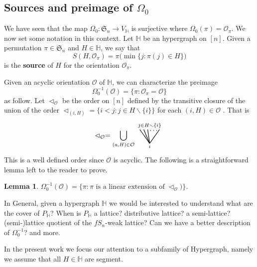 \documentclass[reqno]{amsart}
\newtheorem{lemma}[theorem]{Lemma}
\theoremstyle{definition}
\newcommand{\ssm}{\smallsetminus} %
\newcommand{\defn}[1]{\textbf{\textsf{\color{PineGreen} #1}}} %
\newcommand{\fS}{\mathfrak{S}} %
\newcommand{\less}{\vartriangleleft} %
\newcommand{\Or}{\mathcal O}  %
\newcommand{\HH}{\mathbb H}  %
\begin{document}
\subsection{Sources and preimage of $\Omega_0$} 
\label{subsec:notation}

We have seen that the map $\Omega_0 \colon \fS_n \to V_{\HH}$ is surjective where $\Omega_0(\pi)=\Or_\pi$.
We now set some notation in this context. Let $\HH$ be  an hypergraph on $[n]$. Given a permutation $\pi\in\fS_n$ and $H\in \HH$,
we say that 
\begin{equation}\label{eq:source}
	S(H,\Or_\pi)=\pi\big( \min\{j:\pi(j)\in H\}\big)
\end{equation}
is the \defn{source} of $H$ for the orientation $\Or_\pi$. 

Given an acyclic orientation $\Or$ of $\HH$,  we can characterize the preimage 
	$$ \Omega_0^{-1}(\Or)=\{ \pi : \Or_\pi=\Or\}$$
as follow. Let $\less_\Or$ be the order on $[n]$ defined by the transitive closure of the union of 
the order $\less_{(i,H)}=\big\{ i< j : j\in H\ssm\{i\}\big\}$ for each $(i,H)\in \Or$ . That is
 	$$\less_\Or =  \bigcup_{(a,H)\in \Or} 
	\begin{tikzpicture}[scale=1,baseline=.0cm]
	\node at (0,-.45) {$\scriptstyle i$};
	\node at (0,.6) {$\scriptstyle j\in H\ssm \{i\}$};
	\node at (.2,.35) {$\ldots$};
	\draw [thick] (0,-.3)--(-.5,.4); 
	\draw [thick] (0,-.3)--(-.3,.4); 
	\draw [thick] (0,-.3)--(-.1,.4); 
	\draw [thick] (0,-.3)--(.5,.4); 
	\end{tikzpicture}
	$$
This is a well defined order since $\Or$ is acyclic. The following is a straightforward lemma left to the reader to prove.
\begin{lemma}\label{lem:prepi}   $ \Omega_0^{-1}(\Or) =\big\{ \pi : \pi \text{ is a linear extension of }  \less_\Or)\big\}$.
\end{lemma}


In General, given a hypergraph $\HH$ we would be interested to understand what are the cover of $P_{\HH}$? 
When is $P_{\HH}$ a lattice? distributive lattice? a semi-lattice? (semi-)lattice quotient of the $fS_n$-weak lattice?
Can we have a better description of $\Omega_0^{-1}$? and more.

In the present work we focus our attention to a subfamily of Hypergraph, namely we assume that all $H\in \HH$ are segment.

\end{document}

